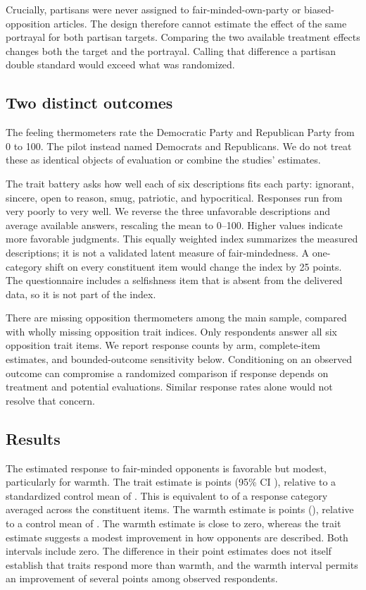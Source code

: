 \documentclass[11pt]{article}
\begin{document}
Crucially, partisans were never assigned to fair-minded-own-party or biased-opposition articles. The design therefore cannot estimate the effect of the same portrayal for both partisan targets. Comparing the two available treatment effects changes both the target and the portrayal. Calling that difference a partisan double standard would exceed what was randomized.

\subsection{Two distinct outcomes}
The feeling thermometers rate the Democratic Party and Republican Party from 0 to 100. The pilot instead named Democrats and Republicans. We do not treat these as identical objects of evaluation or combine the studies' estimates.

The trait battery asks how well each of six descriptions fits each party: ignorant, sincere, open to reason, smug, patriotic, and hypocritical. Responses run from very poorly to very well. We reverse the three unfavorable descriptions and average available answers, rescaling the mean to 0--100. Higher values indicate more favorable judgments. This equally weighted index summarizes the measured descriptions; it is not a validated latent measure of fair-mindedness. A one-category shift on every constituent item would change the index by 25 points. The questionnaire includes a selfishness item that is absent from the delivered data, so it is not part of the index.

There are \YgFtMissing{} missing opposition thermometers among the main sample, compared with \YgTraitMissing{} wholly missing opposition trait indices. Only \YgCompleteN{} respondents answer all six opposition trait items. We report response counts by arm, complete-item estimates, and bounded-outcome sensitivity below. Conditioning on an observed outcome can compromise a randomized comparison if response depends on treatment and potential evaluations. Similar response rates alone would not resolve that concern.

\subsection{Results}
The estimated response to fair-minded opponents is favorable but modest, particularly for warmth. The trait estimate is \YgOutTraitEstimate{} points (95\% CI \YgOutTraitCI{}), relative to a standardized control mean of \YgOutTraitControl{}. This is equivalent to \YgTraitCategory{} of a response category averaged across the constituent items. The warmth estimate is \YgOutFtEstimate{} points (\YgOutFtCI{}), relative to a control mean of \YgOutFtControl{}. The warmth estimate is close to zero, whereas the trait estimate suggests a modest improvement in how opponents are described. Both intervals include zero. The difference in their point estimates does not itself establish that traits respond more than warmth, and the warmth interval permits an improvement of several points among observed respondents.
\end{document}
